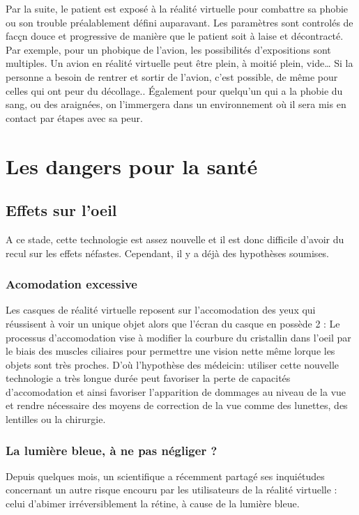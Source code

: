 \documentclass[12pt, a4paper]{report}
\begin{document}
Par la suite, le patient est exposé à la réalité virtuelle pour combattre sa phobie ou son trouble préalablement défini auparavant. Les paramètres sont controlés de facçn douce et progressive de manière que le patient soit à laise et décontracté. Par exemple, pour un phobique de l'avion, les possibilités d'expositions sont multiples. Un avion en réalité virtuelle peut être plein, à moitié plein, vide\ldots{}  Si la personne a besoin de rentrer et sortir de l'avion, c'est possible, de même pour celles qui ont peur du décollage.. \'{E}galement pour quelqu'un qui a la phobie du sang, ou des araignées, on l'immergera dans un environnement où il sera mis en contact par étapes avec sa peur.



\chapter[Dangers]{Les dangers pour la santé}

\section{Effets sur l'oeil}

A ce stade, cette technologie est assez nouvelle et il est donc difficile d'avoir du recul sur les effets néfastes. Cependant, il y a déjà des hypothèses soumises.

\subsection{Acomodation excessive} Les casques de réalité virtuelle reposent sur l'accomodation des yeux qui réussisent à voir un unique objet alors que l'écran du casque en possède 2 : Le processus d'accomodation vise à modifier la courbure du cristallin dans l'oeil par le biais des muscles ciliaires pour permettre une vision nette même lorque les objets sont très proches.
D'où l'hypothèse des médeicin: utiliser cette nouvelle  technologie a très longue durée peut favoriser la perte de capacités d'accomodation et ainsi favoriser l'apparition de dommages au niveau de la vue et rendre nécessaire des moyens de correction de la vue comme des lunettes, des lentilles ou la chirurgie.

\subsection{La lumière bleue, à ne pas négliger ?}

Depuis quelques mois, un scientifique a récemment partagé ses inquiétudes concernant un autre risque encouru par les utilisateurs de la réalité virtuelle : celui d'abimer irréversiblement la rétine, à cause de la lumière bleue.
\end{document}
